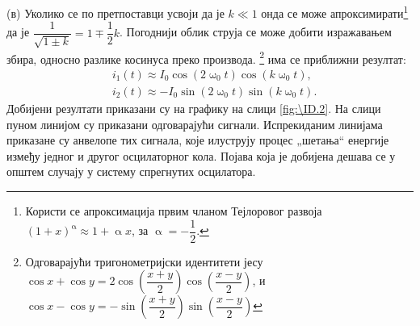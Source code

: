 (в) Уколико се по претпоставци усвоји да је $k\ll1$ онда се може 
апроксимирати\footnote{Користи се апроксимација првим чланом Тејлоровог развоја
$(1 + x)^{\upalpha} \approx 1 + \upalpha x$, за $\upalpha = -\dfrac{1}{2}$.}
да је $\dfrac{1}{\sqrt{1 \pm k}} = 1 \mp \dfrac{1}{2}k$. Погоднији облик струја се може добити 
изражавањем збира, односно разлике косинуса преко производа.
\footnote{ Одговарајући тригонометријски идентитети јесу
$\cos x + \cos y = 2 \cos\left(\dfrac{x+y}{2}\right)\cos\left(\dfrac{x-y}{2}\right)$, 
и $\cos x - \cos y = - \sin\left(\dfrac{x+y}{2}\right)\sin\left(\dfrac{x-y}{2}\right)$} има се приближни
резултат:
\begin{eqnarray}
    & i_1(t) \approx I_0 \cos(2\upomega_0 t) \cos( k\upomega_0 t ), \\
    & i_2(t) \approx -I_0 \sin(2\upomega_0 t) \sin( k\upomega_0 t ).
\end{eqnarray}
Добијени резултати приказани су на графику на слици \ref{fig:\ID.2}. На слици пуном линијом 
су приказани одговарајући сигнали. Испрекиданим линијама приказане су анвелопе тих сигнала, 
које илуструју процес „шетања“ енергије између једног и другог осцилаторног кола. 
Појава која је добијена дешава се у општем случају у систему спрегнутих осцилатора. 


